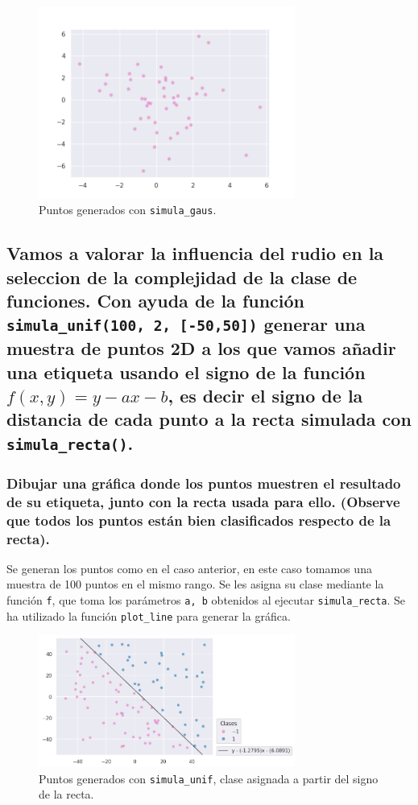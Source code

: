 \documentclass[a4paper, 20pt]{article}
\begin{document}
\begin{figure}[H]
    \centering
    \includegraphics[width=0.75\textwidth]{points1b}
    \caption{Puntos generados con \texttt{simula\_gaus}.}
    \label{fig:1b}
\end{figure}

\subsection{Vamos a valorar la influencia del rudio en la seleccion de la complejidad de la clase de funciones. Con ayuda de la función \texttt{simula\_unif(100, 2, [-50,50])} generar una muestra de puntos 2D a los que vamos añadir una etiqueta usando el signo de la función $f(x, y) = y - ax - b$, es decir el signo de la distancia de cada punto a la recta simulada con \texttt{simula\_recta()}.}
\subsubsection{Dibujar una gráfica donde los puntos muestren el resultado de su etiqueta, junto con la recta usada para ello. (Observe que todos los puntos están bien clasificados respecto de la recta).}

Se generan los puntos como en el caso anterior, en este caso tomamos una muestra de 100 puntos en el mismo rango. Se les asigna su clase mediante la función \texttt{f}, que toma los parámetros \texttt{a, b} obtenidos al ejecutar \texttt{simula\_recta}. Se ha utilizado la función \texttt{plot\_line} para generar la gráfica.

\begin{figure}[H]
    \centering
    \includegraphics[width=0.75\textwidth]{recta}
    \caption{Puntos generados con \texttt{simula\_unif}, clase asignada a partir del signo de la recta.}
    \label{fig:recta}
\end{figure}
\end{document}
